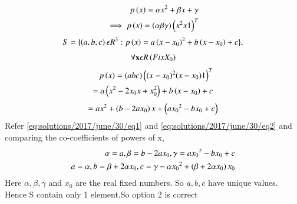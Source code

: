 \begin{align}
p \left(x\right)= \alpha x^2+\beta x + \gamma\\
\implies p \left(x\right)=  \left(\alpha \beta \gamma\right)\left(x^2 x 1\right)^T \label{eq:solutions/2017/june/30/eq1}
\end{align}
\begin{align*}
S= \{\left(a,b,c\right)  \epsilon R^3: p \left(x\right)= a \left(x-x_0\right)^2+b \left(x-x_0\right)+ c\},
\end{align*}
\begin{align}
\forall  \mathbf{x} \epsilon R \left(Fix X_0\right)
\end{align}
\begin{align}
p \left(x\right)= \left(a b c\right)\left((x-x_0)^2 (x-x_0) 1\right)^T\\
=a \left(x^2-2x_0x+x_0^2\right)+b \left(x-x_0\right)+c
\end{align}
\begin{align}
= a x^2+\left(b-2 a x_0\right)x+ \left(a{x_0}^2-b x_0+c\right)\label{eq:solutions/2017/june/30/eq2}
\end{align}
Refer \eqref{eq:solutions/2017/june/30/eq1} and \eqref{eq:solutions/2017/june/30/eq2} and comparing the co-coefficients of powers of x,
\begin{align}
\alpha=a,
\beta=b-2ax_0,
\gamma= a{x_0}^2-b x_0+c\\
a=\alpha ,b= \beta+2\alpha x_0, c=\gamma-\alpha {x_0}^2+\left(\beta+2\alpha x_0\right)x_0
\end{align}
Here $\alpha, \beta, \gamma$ and $x_0$ are the real fixed numbers. So $a,b,c$ have unique values.\\
Hence S contain only 1 element.So option 2 is correct

